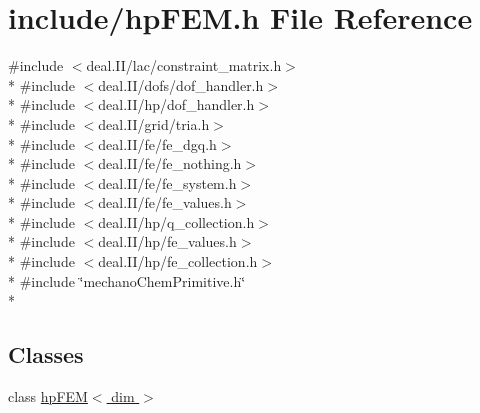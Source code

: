 \section{include/hp\-F\-E\-M.h File Reference}
\label{hp_f_e_m_8h}
{\ttfamily \#include $<$deal.\-I\-I/lac/constraint\-\_\-matrix.\-h$>$}\\*
{\ttfamily \#include $<$deal.\-I\-I/dofs/dof\-\_\-handler.\-h$>$}\\*
{\ttfamily \#include $<$deal.\-I\-I/hp/dof\-\_\-handler.\-h$>$}\\*
{\ttfamily \#include $<$deal.\-I\-I/grid/tria.\-h$>$}\\*
{\ttfamily \#include $<$deal.\-I\-I/fe/fe\-\_\-dgq.\-h$>$}\\*
{\ttfamily \#include $<$deal.\-I\-I/fe/fe\-\_\-nothing.\-h$>$}\\*
{\ttfamily \#include $<$deal.\-I\-I/fe/fe\-\_\-system.\-h$>$}\\*
{\ttfamily \#include $<$deal.\-I\-I/fe/fe\-\_\-values.\-h$>$}\\*
{\ttfamily \#include $<$deal.\-I\-I/hp/q\-\_\-collection.\-h$>$}\\*
{\ttfamily \#include $<$deal.\-I\-I/hp/fe\-\_\-values.\-h$>$}\\*
{\ttfamily \#include $<$deal.\-I\-I/hp/fe\-\_\-collection.\-h$>$}\\*
{\ttfamily \#include \char`\"{}mechano\-Chem\-Primitive.\-h\char`\"{}}\\*
\subsection*{Classes}
\begin{DoxyCompactItemize}
\item 
class \hyperlink{classhp_f_e_m}{hp\-F\-E\-M$<$ dim $>$}
\end{DoxyCompactItemize}

